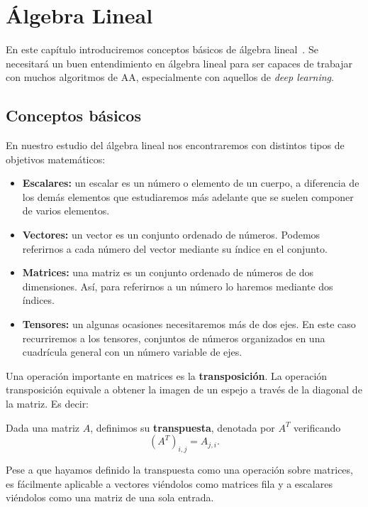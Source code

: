 \chapter{Álgebra Lineal}\label{sec:algebra}
En este capítulo introduciremos conceptos básicos de álgebra lineal~\cite{Goodfellow-et-al-2016}. Se necesitará un buen entendimiento en álgebra lineal para ser capaces de trabajar con muchos algoritmos de \ac{AA}, especialmente con aquellos de \textit{deep learning}.

\section{Conceptos básicos}
En nuestro estudio del álgebra lineal nos encontraremos con distintos tipos de objetivos matemáticos:
\begin{itemize}
    \item \textbf{Escalares:} un escalar es un número o elemento de un cuerpo, a diferencia de los demás elementos que estudiaremos más adelante que se suelen componer de varios elementos.
    \item \textbf{Vectores:} un vector es un conjunto ordenado de números. Podemos referirnos a cada número del vector mediante su índice en el conjunto.
    \item \textbf{Matrices:} una matriz es un conjunto ordenado de números de dos dimensiones. Así, para referirnos a un número lo haremos mediante dos índices.
    \item \textbf{Tensores:} un algunas ocasiones necesitaremos más de dos ejes. En este caso recurriremos a los tensores, conjuntos de números organizados en una cuadrícula general con un número variable de ejes.
\end{itemize}

Una operación importante en matrices es la \textbf{transposición}. La operación transposición equivale a obtener la imagen de un espejo a través de la diagonal de la matriz. Es decir:

\begin{definition}
Dada una matriz $A$, definimos su \textbf{transpuesta}, denotada por $A^T$ verificando
    \begin{equation}
    (A^T)_{i,j} = A_{j,i}.
    \end{equation}
\end{definition}

Pese a que hayamos definido la transpuesta como una operación sobre matrices, es fácilmente aplicable a vectores viéndolos como matrices fila y a escalares viéndolos como una matriz de una sola entrada.

